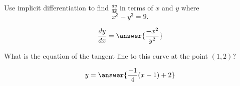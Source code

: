 \documentclass{ximera}
\author{Steven Gubkin\and Nela Lakos}
\begin{document}
\begin{exercise}

Use implicit differentiation to find $\frac{dy}{dx}$ in terms  of $x$ and $y$ where
\[
x^3+y^3 = 9.
\]
\begin{prompt}
\[
\frac{dy}{dx} = \answer{\frac{-x^2}{y^2}}
\]
\end{prompt}
What is the equation of the tangent line to this curve at the point $(1,2)$?
\begin{prompt}
\[
y = \answer{\frac{-1}{4}(x-1)+2}
\]
\end{prompt}
\end{exercise}
\end{document}
